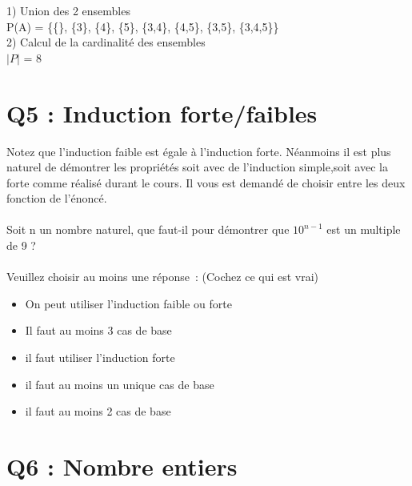   1) Union des 2 ensembles \\

  P(A) = \{\{\}, \{3\}, \{4\}, \{5\}, \{3,4\}, \{4,5\}, \{3,5\}, \{3,4,5\}\} \\

  \vspace{4mm} %
  2) Calcul de la cardinalité des ensembles \\

  $|P|$ = 8 \\

\newpage
\section{Q5 : Induction forte/faibles}

\vspace{5mm} %

Notez que l’induction faible est égale à l’induction forte. Néanmoins il est plus naturel de démontrer les propriétés soit avec de l’induction simple,soit avec la forte comme réalisé durant le cours. Il vous est demandé de choisir entre les deux fonction de l’énoncé.\\ \\
Soit n un nombre naturel, que faut-il pour démontrer que $10^{n-1}$ est un multiple de 9 ? \\ \\
Veuillez choisir au moins une réponse : (Cochez ce qui est vrai)\\

\begin{itemize}[label=$\square$]
\item On peut utiliser l’induction faible ou forte
\item Il faut au moins 3 cas de base
\item il faut utiliser l’induction forte
\item il faut au moins un unique cas de base
\item il faut au moins 2 cas de base
\end{itemize}

\vspace{5mm} %

\section{Q6 : Nombre entiers}

\vspace{5mm} %


